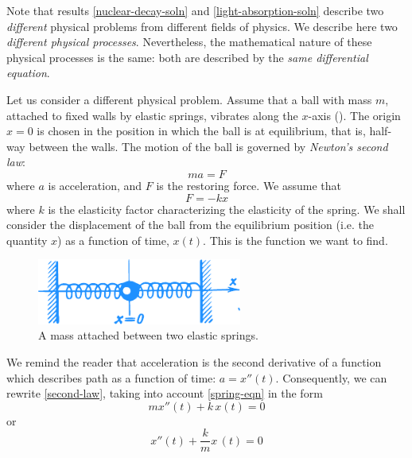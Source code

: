 Note that results \eqref{nuclear-decay-soln} and \eqref{light-absorption-soln} describe two \emph{different} physical problems from different fields of physics. We describe here two \emph{different physical processes}. Nevertheless, the mathematical nature of these physical processes is the same: both are described by the \emph{same differential equation}.

Let us consider a different physical problem. Assume that a ball with mass $m$, attached to fixed walls by elastic springs, vibrates along the $x$-axis (). The origin $x = 0$ is chosen in the position in which the ball is at equilibrium, that is, half-way between the walls. The motion of the ball is governed by \emph{Newton's second law}:
\begin{equation}%
ma = F
\label{second-law}
\end{equation}
where $a$ is acceleration, and $F$ is the restoring force. We assume that
\begin{equation}%
F= - kx
\label{spring-eqn}
\end{equation}
where $k$ is the elasticity factor characterizing the elasticity of the spring.
We shall consider the displacement of the ball from the equilibrium position (i.e. the quantity $x$) as a function of time, $x (t)$. This is the function we want to find.

\begin{figure}[!ht]%
\centering
\includegraphics[width=0.6\textwidth]{figures/fig-58.pdf} 
\caption{A mass attached between two elastic springs.}
\label{fig-58}
\end{figure}


We remind the reader that acceleration is the second derivative of a function which describes path as a function of time: $a = x'' (t)$. Consequently, we can rewrite \eqref{second-law}, taking into account \eqref{spring-eqn} in the form
\begin{equation*}%
m x'' (t) + k \, x (t) = 0
\end{equation*}
or
\begin{equation}%
\boxed{
x'' (t) + \dfrac{k}{m} x \, (t) = 0
}
\label{spring-eqn2}
\end{equation}

